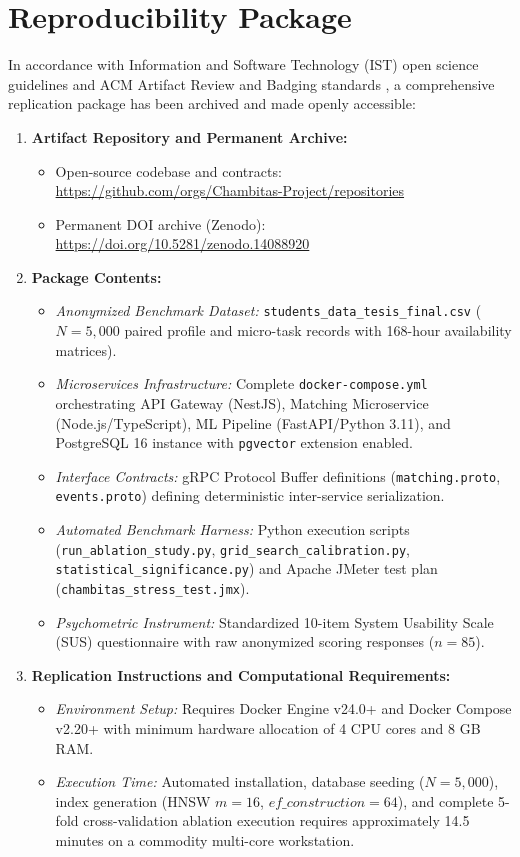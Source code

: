 \documentclass[a4paper,fleqn]{cas-dc}
\begin{document}
\section{Reproducibility Package}
\label{sec:reproducibility}
In accordance with Information and Software Technology (IST) open science guidelines \cite{elsevier_ist2026} and ACM Artifact Review and Badging standards \cite{acm2020}, a comprehensive replication package has been archived and made openly accessible:
\begin{enumerate}
    \item \textbf{Artifact Repository and Permanent Archive:}
    \begin{itemize}
        \item Open-source codebase and contracts: \url{https://github.com/orgs/Chambitas-Project/repositories}
        \item Permanent DOI archive (Zenodo): \url{https://doi.org/10.5281/zenodo.14088920}
    \end{itemize}
    \item \textbf{Package Contents:}
    \begin{itemize}
        \item \textit{Anonymized Benchmark Dataset:} \texttt{students\_data\_tesis\_final.csv} ($N = 5,000$ paired profile and micro-task records with 168-hour availability matrices).
        \item \textit{Microservices Infrastructure:} Complete \texttt{docker-compose.yml} orchestrating API Gateway (NestJS), Matching Microservice (Node.js/TypeScript), ML Pipeline (FastAPI/Python 3.11), and PostgreSQL 16 instance with \texttt{pgvector} extension enabled.
        \item \textit{Interface Contracts:} gRPC Protocol Buffer definitions (\texttt{matching.proto}, \texttt{events.proto}) defining deterministic inter-service serialization.
        \item \textit{Automated Benchmark Harness:} Python execution scripts (\texttt{run\_ablation\_study.py}, \texttt{grid\_search\_calibration.py}, \texttt{statistical\_significance.py}) and Apache JMeter test plan (\texttt{chambitas\_stress\_test.jmx}).
        \item \textit{Psychometric Instrument:} Standardized 10-item System Usability Scale (SUS) questionnaire with raw anonymized scoring responses ($n = 85$).
    \end{itemize}
    \item \textbf{Replication Instructions and Computational Requirements:}
    \begin{itemize}
        \item \textit{Environment Setup:} Requires Docker Engine v24.0+ and Docker Compose v2.20+ with minimum hardware allocation of 4 CPU cores and 8 GB RAM.
        \item \textit{Execution Time:} Automated installation, database seeding ($N = 5,000$), index generation (HNSW $m = 16$, $ef\_construction = 64$), and complete 5-fold cross-validation ablation execution requires approximately 14.5 minutes on a commodity multi-core workstation.
    \end{itemize}
\end{enumerate}
\end{document}
